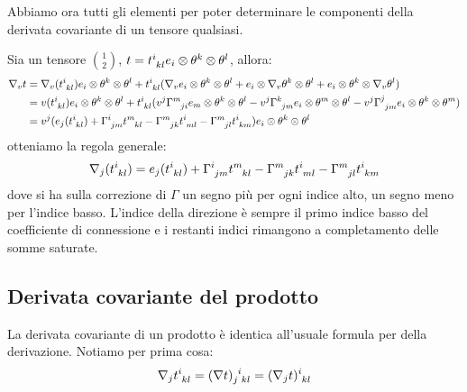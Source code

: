 Abbiamo ora tutti gli elementi per poter determinare le componenti della derivata covariante di un tensore qualsiasi.
\begin{esempio}
Sia un tensore $\binom{1}{2}$, $t=\tensor{t}{^i_{kl}}e_i \otimes \theta^k \otimes \theta^l$, allora:
\begin{align*}
    \nabla_v t &= \nabla_v( \tensor{t}{^i_{kl}} ) e_i \otimes \theta^k \otimes \theta^l + \tensor{t}{^i_{kl}}(\nabla_v e_i \otimes \theta^k \otimes \theta^l + e_i \otimes \nabla_v \theta^k \otimes \theta^l + e_i \otimes \theta^k \otimes \nabla_v \theta^l ) \\
    &= v(\tensor{t}{^i_{kl}}) e_i \otimes \theta^k \otimes \theta^l + \tensor{t}{^i_{kl}}(
    v^j \tensor{\Gamma}{^m_{ji}}e_m \otimes \theta^k \otimes \theta^l -
    v^j \tensor{\Gamma}{^k_{jm}} e_i \otimes \theta^m \otimes \theta^l - 
    v^j \tensor{\Gamma}{^j_{jm}} e_i \otimes \theta^k \otimes \theta^m ) \\
    &=v^j( e_j(\tensor{t}{^i_{kl}} )+ \tensor{\Gamma}{^i_{jm}}\tensor{t}{^m_{kl}} -
    \tensor{\Gamma}{^m_{jk}}\tensor{t}{^i_{ml}} -
    \tensor{\Gamma}{^m_{jl}}\tensor{t}{^i_{km}}) e_i \otimes \theta^k \otimes \theta^l
\end{align*}
otteniamo la regola generale:
\begin{equation*}
    \nabla_j (\tensor{t}{^i_{kl}} )= e_j(\tensor{t}{^i_{kl}} )+ \tensor{\Gamma}{^i_{jm}}\tensor{t}{^m_{kl}} -
    \tensor{\Gamma}{^m_{jk}}\tensor{t}{^i_{ml}} -
    \tensor{\Gamma}{^m_{jl}}\tensor{t}{^i_{km}}
\end{equation*}
dove si ha sulla correzione di $\Gamma$ un segno più per ogni indice alto, un segno meno per l'indice basso. L'indice della direzione è sempre il primo indice basso del coefficiente di connessione e i restanti indici rimangono a completamento delle somme saturate.
\end{esempio}
\subsection{Derivata covariante del prodotto}
La derivata covariante di un prodotto è identica all'usuale formula per della derivazione.
Notiamo per prima cosa:
\begin{equation*}
    \nabla_j \tensor{t}{^i_{kl}} = \tensor{(\nabla t)}{_j^i_{kl}} = \tensor{(\nabla_j t)}{^i_{kl}}
\end{equation*}

